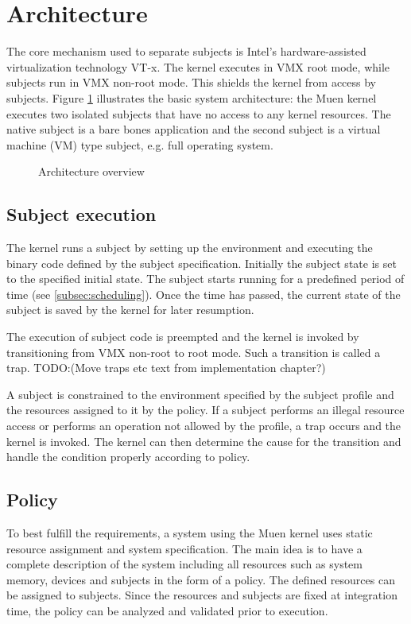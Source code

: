 \section{Architecture}
The core mechanism used to separate subjects is Intel's hardware-assisted
virtualization technology VT-x. The kernel executes in VMX root mode, while
subjects run in VMX non-root mode. This shields the kernel from access by
subjects. Figure \ref{fig:architecture-overview} illustrates the basic system
architecture: the Muen kernel executes two isolated subjects that have no access
to any kernel resources. The native subject is a bare bones application and the
second subject is a virtual machine (VM) type subject, e.g. full operating
system.

\begin{figure}[h]
	\centering
	
	\caption{Architecture overview}
	\label{fig:architecture-overview}
\end{figure}

\subsection{Subject execution}
The kernel runs a subject by setting up the environment and executing the binary
code defined by the subject specification. Initially the subject state is set to
the specified initial state. The subject starts running for a predefined period
of time (see \ref{subsec:scheduling}). Once the time has passed, the current
state of the subject is saved by the kernel for later resumption.

The execution of subject code is preempted and the kernel is invoked by
transitioning from VMX non-root to root mode. Such a transition is called a
trap. TODO:(Move traps etc text from implementation chapter?)

A subject is constrained to the environment specified by the subject profile and
the resources assigned to it by the policy. If a subject performs an illegal
resource access or performs an operation not allowed by the profile, a trap
occurs and the kernel is invoked. The kernel can then determine the cause for
the transition and handle the condition properly according to policy.

\subsection{Policy}
To best fulfill the requirements, a system using the Muen kernel uses static
resource assignment and system specification. The main idea is to have a
complete description of the system including all resources such as system
memory, devices and subjects in the form of a policy. The defined resources can
be assigned to subjects. Since the resources and subjects are fixed at
integration time, the policy can be analyzed and validated prior to execution.

